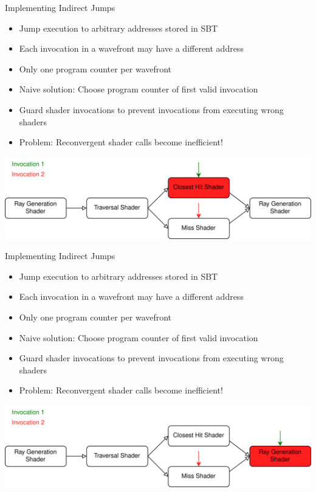 \documentclass[aspectratio=169,t]{beamer}
\begin{document}
\begin{slide}{Implementing Indirect Jumps}
 \begin{itemize}
  \item Jump execution to arbitrary addresses stored in SBT
  \item Each invocation in a wavefront may have a different address
  \item Only one program counter per wavefront
  \item Naive solution: Choose program counter of first valid invocation
  \item Guard shader invocations to prevent invocations from executing wrong shaders
  \item Problem: Reconvergent shader calls become inefficient!
 \end{itemize}
 \includegraphics[width=\textwidth]{graphics/RTStages2-3.png}
\end{slide}

\begin{slide}{Implementing Indirect Jumps}
 \begin{itemize}
  \item Jump execution to arbitrary addresses stored in SBT
  \item Each invocation in a wavefront may have a different address
  \item Only one program counter per wavefront
  \item Naive solution: Choose program counter of first valid invocation
  \item Guard shader invocations to prevent invocations from executing wrong shaders
  \item Problem: Reconvergent shader calls become inefficient!
 \end{itemize}
 \includegraphics[width=\textwidth]{graphics/RTStages2-4.png}
\end{slide}
\end{document}
